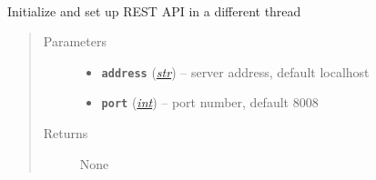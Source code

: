 \documentclass[letterpaper,10pt,english]{sphinxmanual}
\begin{document}
\begin{fulllineitems}
\begin{fulllineitems}


{\hyperref[util/api:escape.util.api.AbstractAPI.initialize]{\emph{}}}



\end{fulllineitems}


\begin{fulllineitems}
\label{service/sas_API:escape.service.sas_API.ServiceLayerAPI.shutdown}~



{\hyperref[util/api:escape.util.api.AbstractAPI.shutdown]{\emph{}}}



\end{fulllineitems}


\begin{fulllineitems}
\label{service/sas_API:escape.service.sas_API.ServiceLayerAPI._initiate_rest_api}
Initialize and set up REST API in a different thread
\begin{quote}\begin{description}
\item[{Parameters}] \leavevmode\begin{itemize}
\item {} 
\textbf{\texttt{address}} (\href{https://docs.python.org/2.7/library/functions.html\#str}{\emph{str}}) -- server address, default localhost

\item {} 
\textbf{\texttt{port}} (\href{https://docs.python.org/2.7/library/functions.html\#int}{\emph{int}}) -- port number, default 8008

\end{itemize}

\item[{Returns}] \leavevmode
None

\end{description}\end{quote}


\end{fulllineitems}
\end{fulllineitems}
\end{document}
